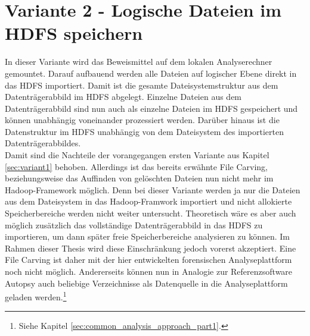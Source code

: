 \section{Variante 2 - Logische Dateien im HDFS speichern}
In dieser Variante wird das Beweismittel auf dem lokalen Analyserechner gemountet. Darauf aufbauend werden alle Dateien auf logischer Ebene direkt in das HDFS importiert. Damit ist die gesamte Dateisystemstruktur aus dem Datenträgerabbild im HDFS abgelegt. Einzelne Dateien aus dem Datenträgerabbild sind nun auch als einzelne Dateien im HDFS gespeichert und können unabhängig voneinander prozessiert werden. Darüber hinaus ist die Datenstruktur im HDFS unabhängig von dem Dateisystem des importierten Datenträgerabbildes.\\
Damit sind die Nachteile der vorangegangen ersten Variante aus Kapitel \ref{sec:variant1} behoben. Allerdings ist das bereits erwähnte File Carving, beziehungsweise das Auffinden von gelöschten Dateien nun nicht mehr im Hadoop-Framework möglich. Denn bei dieser Variante werden ja nur die Dateien aus dem Dateisystem in das Hadoop-Framwork importiert und nicht allokierte Speicherbereiche werden nicht weiter untersucht. Theoretisch wäre es aber auch möglich zusätzlich das vollständige Datenträgerabbild in das HDFS zu importieren, um dann später freie Speicherbereiche analysieren zu können. Im Rahmen dieser Thesis wird diese Einschränkung jedoch vorerst akzeptiert. Eine File Carving ist daher mit der hier entwickelten forensischen Analyseplattform noch nicht möglich. Andererseits können nun in Analogie zur Referenzsoftware Autopsy auch beliebige Verzeichnisse als Datenquelle in die Analyseplattform geladen werden.\footnote{Siehe Kapitel \ref{sec:common_analysis_approach_part1}.}\\ 

